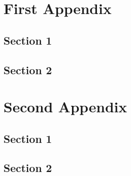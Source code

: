 \chapter{First Appendix}\label{app:}
  \section{Section 1}\label{sec:}
    \lipsum[34-36]
  \section{Section 2}\label{sec:}
    \lipsum[38]

\chapter{Second Appendix}\label{app:}
  \section{Section 1}\label{sec:}
    \lipsum[34-36]
  \section{Section 2}\label{sec:}
    \lipsum[38]





